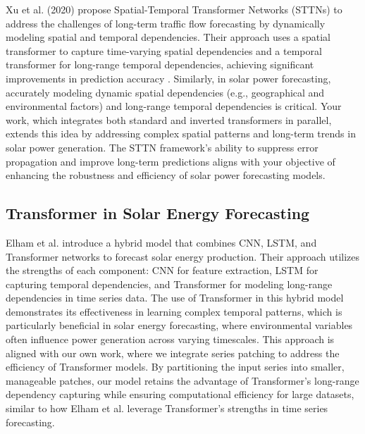 \documentclass[12pt]{uomthesis}
\begin{document}
Xu et al. (2020) propose Spatial-Temporal Transformer Networks (STTNs) to address the challenges of long-term traffic flow forecasting by dynamically modeling spatial and temporal dependencies. Their approach uses a spatial transformer to capture time-varying spatial dependencies and a temporal transformer for long-range temporal dependencies, achieving significant improvements in prediction accuracy \cite{xu2020spatial}. Similarly, in solar power forecasting, accurately modeling dynamic spatial dependencies (e.g., geographical and environmental factors) and long-range temporal dependencies is critical. Your work, which integrates both standard and inverted transformers in parallel, extends this idea by addressing complex spatial patterns and long-term trends in solar power generation. The STTN framework's ability to suppress error propagation and improve long-term predictions aligns with your objective of enhancing the robustness and efficiency of solar power forecasting models.


\subsection{Transformer in Solar Energy Forecasting}

Elham et al. \cite{alali2023solar} introduce a hybrid model that combines CNN, LSTM, and Transformer networks to forecast solar energy production. Their approach utilizes the strengths of each component: CNN for feature extraction, LSTM for capturing temporal dependencies, and Transformer for modeling long-range dependencies in time series data. The use of Transformer in this hybrid model demonstrates its effectiveness in learning complex temporal patterns, which is particularly beneficial in solar energy forecasting, where environmental variables often influence power generation across varying timescales. This approach is aligned with our own work, where we integrate series patching to address the efficiency of Transformer models. By partitioning the input series into smaller, manageable patches, our model retains the advantage of Transformer’s long-range dependency capturing while ensuring computational efficiency for large datasets, similar to how Elham et al. leverage Transformer’s strengths in time series forecasting.
\end{document}
